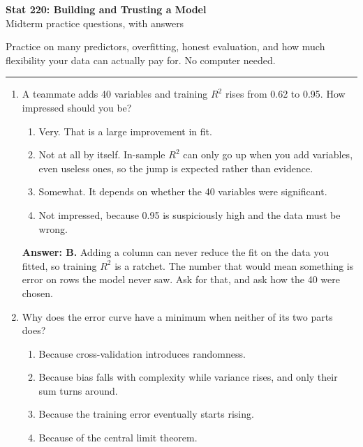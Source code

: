 \documentclass[11pt]{article}
\begin{document}
\begin{center}
{\Large\textbf{Stat 220: Building and Trusting a Model}}\\[3pt]
{\large Midterm practice questions, with answers}\\[6pt]
\end{center}

Practice on many predictors, overfitting, honest evaluation, and how much flexibility your data
can actually pay for. No computer needed.

\vspace{8pt}
\hrule
\vspace{10pt}

\begin{enumerate}[itemsep=14pt]
\item A teammate adds 40 variables and training $R^2$ rises from 0.62 to 0.95. How impressed should you be?

\begin{enumerate}[label=\Alph*., itemsep=1pt, topsep=3pt]
  \item Very. That is a large improvement in fit.
  \item Not at all by itself. In-sample $R^2$ can only go up when you add variables, even useless ones, so the jump is expected rather than evidence.
  \item Somewhat. It depends on whether the 40 variables were significant.
  \item Not impressed, because 0.95 is suspiciously high and the data must be wrong.
\end{enumerate}

\vspace{2pt}
\textbf{Answer: B.} Adding a column can never reduce the fit on the data you fitted, so training $R^2$ is a ratchet. The number that would mean something is error on rows the model never saw. Ask for that, and ask how the 40 were chosen.
\vspace{4pt}

\item Why does the error curve have a minimum when neither of its two parts does?

\begin{enumerate}[label=\Alph*., itemsep=1pt, topsep=3pt]
  \item Because cross-validation introduces randomness.
  \item Because bias falls with complexity while variance rises, and only their sum turns around.
  \item Because the training error eventually starts rising.
  \item Because of the central limit theorem.
\end{enumerate}


\end{enumerate}
\end{document}
